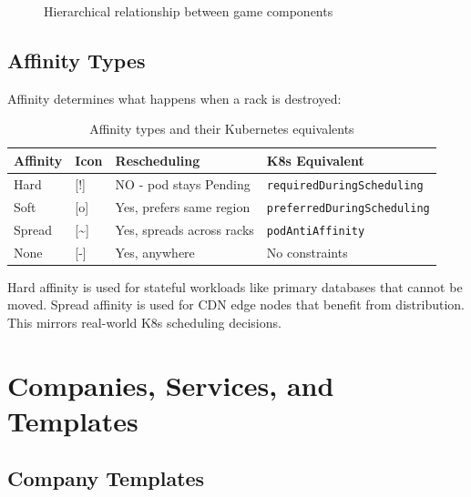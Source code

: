 \documentclass[11pt]{article}
\begin{document}
\begin{figure}[H]
    \centering
    \caption{Hierarchical relationship between game components}
    \label{fig:hierarchy}
\end{figure}

\subsection{Affinity Types}

Affinity determines what happens when a rack is destroyed:

\begin{table}[H]
\centering
\begin{tabular}{@{}llll@{}}
\toprule
\textbf{Affinity} & \textbf{Icon} & \textbf{Rescheduling} & \textbf{K8s Equivalent} \\
\midrule
Hard & {[!]} & NO - pod stays Pending & \texttt{requiredDuringScheduling} \\
Soft & {[o]} & Yes, prefers same region & \texttt{preferredDuringScheduling} \\
Spread & {[\textasciitilde]} & Yes, spreads across racks & \texttt{podAntiAffinity} \\
None & {[-]} & Yes, anywhere & No constraints \\
\bottomrule
\end{tabular}
\caption{Affinity types and their Kubernetes equivalents}
\label{tab:affinity}
\end{table}

Hard affinity is used for stateful workloads like primary databases that cannot be moved. Spread affinity is used for CDN edge nodes that benefit from distribution. This mirrors real-world K8s scheduling decisions.


\section{Companies, Services, and Templates}


\subsection{Company Templates}
\end{document}
